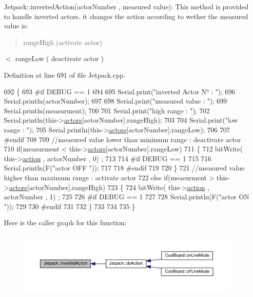 Jetpack\+::inverted\+Action(actor\+Number , measured value)\+: This method is provided to handle inverted actors. it changes the action according to wether the measured value is\+: \begin{quote}
range\+High (activate actor) \end{quote}
$<$ range\+Low ( deactivate actor ) 

Definition at line 691 of file Jetpack.\+cpp.


\begin{DoxyCode}
692 \{
693 \textcolor{preprocessor}{#if DEBUG == 1}
694     
695     Serial.print(\textcolor{stringliteral}{"inverted Actor N° : "});
696     Serial.println(actorNumber);
697 
698     Serial.print(\textcolor{stringliteral}{"measured value : "});
699     Serial.println(measurment);
700 
701     Serial.print(\textcolor{stringliteral}{"high range : "});
702     Serial.println(this->\hyperlink{class_jetpack_a7e16d2f97837f9712a2e6de1c50d99db}{actors}[actorNumber].rangeHigh);
703 
704     Serial.print(\textcolor{stringliteral}{"low range : "});
705     Serial.println(this->\hyperlink{class_jetpack_a7e16d2f97837f9712a2e6de1c50d99db}{actors}[actorNumber].rangeLow);
706 
707 \textcolor{preprocessor}{#endif}
708 
709     \textcolor{comment}{//measured value lower than minimum range : deactivate actor}
710     \textcolor{keywordflow}{if}(measurment < this->\hyperlink{class_jetpack_a7e16d2f97837f9712a2e6de1c50d99db}{actors}[actorNumber].rangeLow)
711     \{
712         bitWrite( this->\hyperlink{class_jetpack_aca3142925a7b0834b34ae91d26af7765}{action} , actorNumber , 0) ;
713 
714 \textcolor{preprocessor}{    #if DEBUG == 1 }
715 
716         Serial.println(F(\textcolor{stringliteral}{"actor OFF "}));
717     
718 \textcolor{preprocessor}{    #endif}
719 
720     \}
721     \textcolor{comment}{//measured value higher than maximum range : activate actor}
722     \textcolor{keywordflow}{else} \textcolor{keywordflow}{if}(measurment > this->\hyperlink{class_jetpack_a7e16d2f97837f9712a2e6de1c50d99db}{actors}[actorNumber].rangeHigh)
723     \{
724         bitWrite( this->\hyperlink{class_jetpack_aca3142925a7b0834b34ae91d26af7765}{action} , actorNumber , 1) ;
725 
726 \textcolor{preprocessor}{    #if DEBUG == 1 }
727 
728         Serial.println(F(\textcolor{stringliteral}{"actor ON "}));
729     
730 \textcolor{preprocessor}{    #endif}
731 
732     \}
733 
734 
735 \}
\end{DoxyCode}
Here is the caller graph for this function\+:
\nopagebreak
\begin{figure}[H]
\begin{center}
\leavevmode
\includegraphics[width=350pt]{df/d1d/class_jetpack_adacfc35fab4a621357caf98ce1c9cb54_icgraph}
\end{center}
\end{figure}
